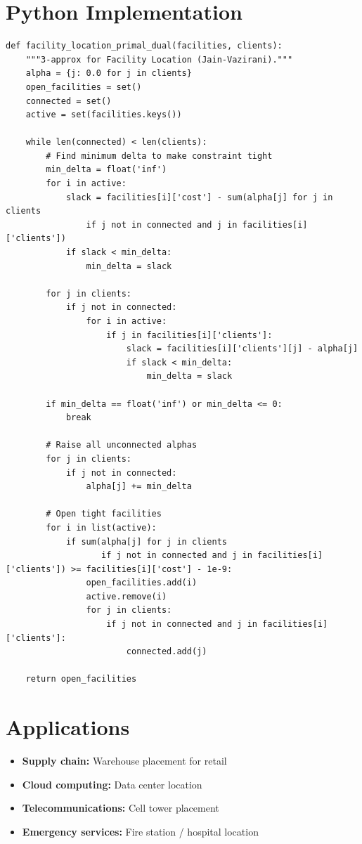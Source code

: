 \section{Python Implementation}

\begin{lstlisting}[style=python, caption=Facility Location Primal-Dual]
def facility_location_primal_dual(facilities, clients):
    """3-approx for Facility Location (Jain-Vazirani)."""
    alpha = {j: 0.0 for j in clients}
    open_facilities = set()
    connected = set()
    active = set(facilities.keys())
    
    while len(connected) < len(clients):
        # Find minimum delta to make constraint tight
        min_delta = float('inf')
        for i in active:
            slack = facilities[i]['cost'] - sum(alpha[j] for j in clients 
                if j not in connected and j in facilities[i]['clients'])
            if slack < min_delta:
                min_delta = slack
        
        for j in clients:
            if j not in connected:
                for i in active:
                    if j in facilities[i]['clients']:
                        slack = facilities[i]['clients'][j] - alpha[j]
                        if slack < min_delta:
                            min_delta = slack
        
        if min_delta == float('inf') or min_delta <= 0:
            break
        
        # Raise all unconnected alphas
        for j in clients:
            if j not in connected:
                alpha[j] += min_delta
        
        # Open tight facilities
        for i in list(active):
            if sum(alpha[j] for j in clients 
                   if j not in connected and j in facilities[i]['clients']) >= facilities[i]['cost'] - 1e-9:
                open_facilities.add(i)
                active.remove(i)
                for j in clients:
                    if j not in connected and j in facilities[i]['clients']:
                        connected.add(j)
    
    return open_facilities
\end{lstlisting}

\section{Applications}
\begin{itemize}
    \item \textbf{Supply chain:} Warehouse placement for retail
    \item \textbf{Cloud computing:} Data center location
    \item \textbf{Telecommunications:} Cell tower placement
    \item \textbf{Emergency services:} Fire station / hospital location
\end{itemize}

